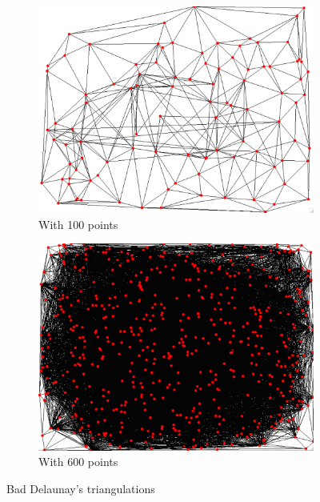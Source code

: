 \documentclass[a4paper,11pt]{article}%
\begin{document}
\begin{figure}[H]
	\centering
	\begin{subfigure}{.5\textwidth}
		\begin{center}
			\includegraphics[width=0.99\linewidth]{convexhull-messedup-abit.png}
		\end{center}
		\caption{With 100 points}
		\label{fig:messedupabit}
	\end{subfigure}%
	\begin{subfigure}{.5\textwidth}
		\begin{center}
			\includegraphics[width=0.99\linewidth]{convexhull-messedup.png}
		\end{center}
		\caption{With 600 points}
		\label{fig:verymessedup}
	\end{subfigure}
	\caption{Bad Delaunay's triangulations}
	\label{fig:messedup}
\end{figure}
\end{document}
